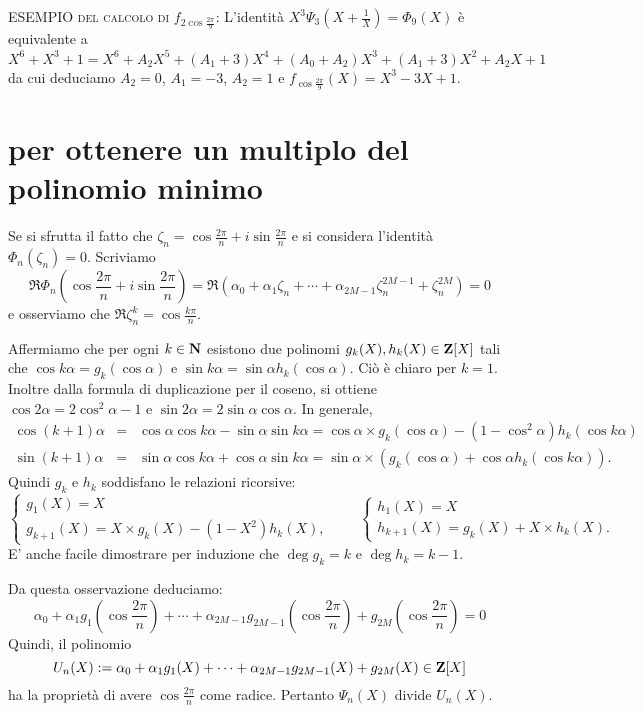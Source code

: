 \documentclass[a4paper,10pt]{article}
\begin{document}
\noindent\textsc{ESEMPIO del calcolo di $f_{2\cos\frac{2\pi}9}$}:  L'identità
$X^3\Psi_{3}\left(X+\frac1X\right)=\Phi_9(X)$ è equivalente a
$$X^6+X^3+1=X^6
 + A_{2} X^5
 + \left( A_{1}
 + 3\right)  X^4
 + \left( A_{0}
 +  A_{2}\right)  X^3
 +  \left( A_{1}
 + 3\right)  X^2
 +  A_{2} X
 + 1
$$
da cui deduciamo $A_2=0$, $A_1=-3$, $A_2=1$ e $f_{\cos \frac{2\pi}9}(X)=X^3-{3}X+1.$

\section{per ottenere un multiplo del polinomio minimo}

Se si sfrutta il fatto che $\zeta_n=\cos\frac{2\pi}n+i\sin\frac{2\pi}n$ e si considera l'identità
$\Phi_n(\zeta_n)=0$. Scriviamo
$$\Re\Phi_n(\cos\frac{2\pi}n+i\sin\frac{2\pi}n)=\Re\left(\alpha_0+\alpha_1\zeta_n+\cdots+\alpha_{2M-1}\zeta_n^{2M-1}+\zeta_n^{2M}\right)=0$$
e osserviamo che $\Re\zeta_n^k=\cos \frac{k\pi}n.$ 

Affermiamo che per ogni $k\in{\bf N}$ esistono due polinomi $g_k(X),h_k(X)\in{\bf Z}[X]$ tali che
$\cos k\alpha=g_k(\cos\alpha)$ e $\sin k\alpha=\sin\alpha h_k(\cos\alpha)$. Ciò è chiaro per $k=1$. Inoltre dalla formula di duplicazione per il coseno, si ottiene
$\cos2\alpha=2\cos^2\alpha-1$ e $\sin2\alpha=2\sin\alpha\cos\alpha$. In generale, 
\begin{eqnarray*}
\cos(k+1)\alpha &=& \cos\alpha\cos k\alpha-\sin\alpha\sin k\alpha=\cos\alpha\times g_k(\cos\alpha)-(1-\cos^2\alpha)h_k(\cos k\alpha)\\
\sin(k+1)\alpha &=& \sin\alpha\cos k\alpha+\cos\alpha\sin k\alpha=\sin\alpha\times \left(g_k(\cos\alpha)+\cos\alpha h_k(\cos k\alpha)\right). 
\end{eqnarray*}
Quindi $g_k$ e $h_k$ soddisfano le relazioni ricorsive:
$$\left\{\begin{array}{l}
          g_1(X)=X\\ g_{k+1}(X)=X\times g_k(X)-(1-X^2)h_k(X),
         \end{array}\right.\qquad
         \left\{\begin{array}{l}
          h_1(X)=X\\ h_{k+1}(X)=g_k(X)+X\times h_k(X).
         \end{array}\right.
         $$
E' anche facile dimostrare per induzione che $\deg g_k=k$ e $\deg h_k=k-1$.
         
         
Da questa osservazione deduciamo:
$$\alpha_0+\alpha_1g_1(\cos\frac{2\pi}{n})+\cdots+\alpha_{2M-1}g_{2M-1}(\cos\frac{2\pi}{n})+g_{2M}(\cos\frac{2\pi}{n})=0$$
Quindi, il polinomio 
$$U_n(X):=\alpha_0+\alpha_1g_1(X)+\cdots+\alpha_{2M-1}g_{2M-1}(X)+g_{2M}(X)\in{\bf Z}[X]$$ 
ha la proprietà di avere $\cos\frac{2\pi}{n}$ come radice. Pertanto $\Psi_{{n}}(X)$ divide $U_n(X)$.
\medskip
  
\end{document}
